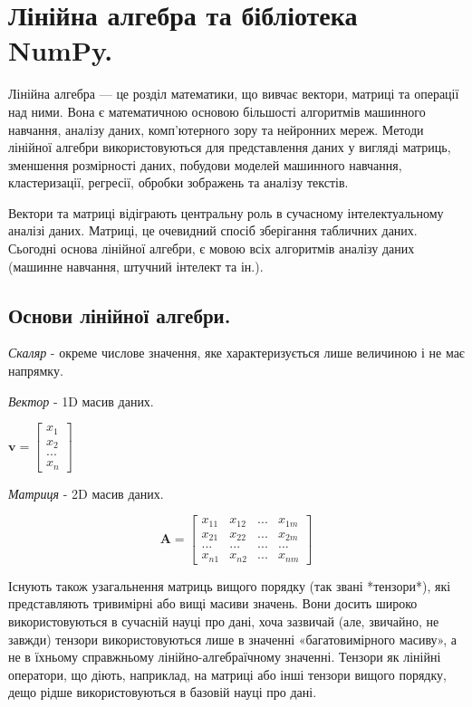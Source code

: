\chapter{Лінійна алгебра та бібліотека NumPy.}

Лінійна алгебра — це розділ математики, що вивчає вектори, матриці та операції над ними. Вона є математичною основою більшості алгоритмів машинного навчання, аналізу даних, комп'ютерного зору та нейронних мереж. Методи лінійної алгебри використовуються для представлення даних у вигляді матриць, зменшення розмірності даних, побудови моделей машинного навчання, кластеризації, регресії, обробки зображень та аналізу текстів.

Вектори та матриці відіграють центральну роль в сучасному інтелектуальному аналізі даних. Матриці, це очевидний спосіб зберігання табличних даних. Сьогодні основа лінійної алгебри, є мовою всіх алгоритмів аналізу даних (машинне навчання, штучний інтелект та ін.).

\section{Основи лінійної алгебри.}

\textit{Скаляр} - окреме числове значення, яке характеризується лише величиною і не має напрямку.

\textit{Вектор} - 1D масив даних.

$\mathbf{v} = \begin{bmatrix} x_1 \\ x_2 \\ ... \\ x_n \end{bmatrix}$

\textit{Матриця} - 2D масив даних.

$$
\mathbf{A} = \begin{bmatrix}
x_{11} & x_{12} & ... & x_{1m} \\
x_{21} & x_{22} & ... & x_{2m} \\
... & ... & ... & ... \\
x_{n1} & x_{n2} & ... & x_{nm}
\end{bmatrix}
$$

Існують також узагальнення матриць вищого порядку (так звані *тензори*), які представляють тривимірні або вищі масиви значень. Вони досить широко використовуються в сучасній науці про дані, хоча зазвичай (але, звичайно, не завжди) тензори використовуються лише в значенні «багатовимірного масиву», а не в їхньому справжньому лінійно-алгебраїчному значенні. Тензори як лінійні оператори, що діють, наприклад, на матриці або інші тензори вищого порядку, дещо рідше використовуються в базовій науці про дані.


